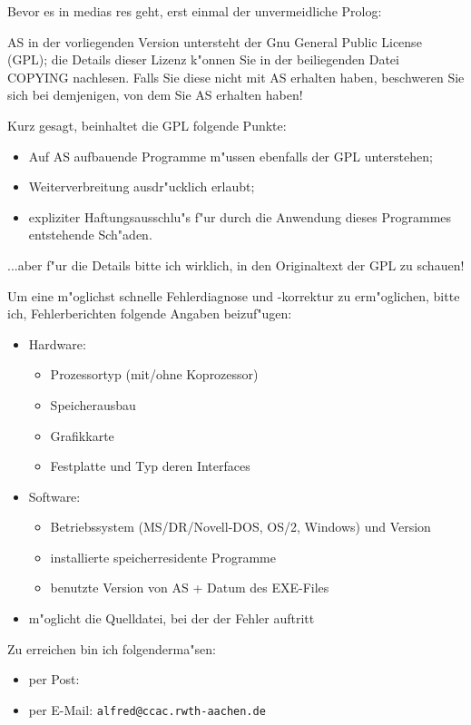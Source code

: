 \documentclass[12pt,a4paper,twoside]{report}
\newcommand{\tty}[1]{{\tt #1}}
\begin{document}
Bevor es in medias res geht, erst einmal der unvermeidliche Prolog:
\par
AS in der vorliegenden Version untersteht der Gnu General Public License
(GPL); die Details dieser Lizenz k"onnen Sie in der beiliegenden Datei
COPYING nachlesen.  Falls Sie diese nicht mit AS erhalten haben,
beschweren Sie sich bei demjenigen, von dem Sie AS erhalten haben!
\par
Kurz gesagt, beinhaltet die GPL folgende Punkte:
\begin{itemize}
\item{Auf AS aufbauende Programme m"ussen ebenfalls der GPL unterstehen;}
\item{Weiterverbreitung ausdr"ucklich erlaubt;}
\item{expliziter Haftungsausschlu"s f"ur durch die Anwendung dieses
      Programmes entstehende Sch"aden.}
\end{itemize}
...aber f"ur die Details bitte ich wirklich, in den Originaltext der GPL
zu schauen!
\par
Um eine m"oglichst schnelle Fehlerdiagnose und -korrektur zu erm"oglichen,
bitte ich, Fehlerberichten folgende Angaben beizuf"ugen:
\begin{itemize}
\item{Hardware: \begin{itemize}
                \item{Prozessortyp (mit/ohne Koprozessor)}
                \item{Speicherausbau}
                \item{Grafikkarte}
                \item{Festplatte und Typ deren Interfaces}
                \end{itemize}}
\item{Software: \begin{itemize}
                \item{Betriebssystem (MS/DR/Novell-DOS, OS/2, Windows)
		und Version}
                \item{installierte speicherresidente Programme}
                \item{benutzte Version von AS + Datum des EXE-Files}
                \end{itemize}}
\item{m"oglicht die Quelldatei, bei der der Fehler auftritt}
\end{itemize}
Zu erreichen bin ich folgenderma"sen:
\begin{itemize}
\item{per Post: }
\item{per E-Mail: \tty{alfred@ccac.rwth-aachen.de}}
\end{itemize}
\end{document}
